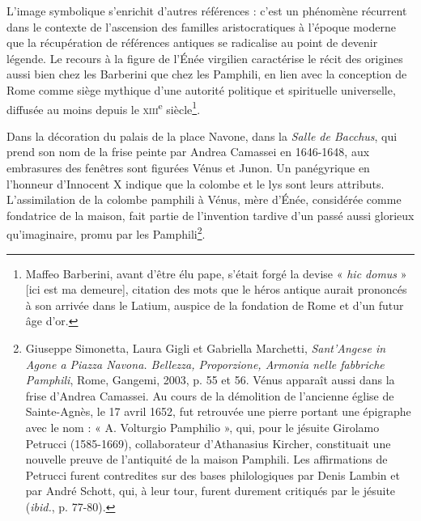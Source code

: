 \documentclass[12pt,twoside,openany]{book}
\begin{document}
L’image symbolique s’enrichit d’autres références : c’est un phénomène récurrent dans le contexte de l’ascension des familles aristocratiques à l’époque moderne que la récupération de références antiques se radicalise au point de devenir légende. Le recours à la figure de l’Énée virgilien caractérise le récit des origines aussi bien chez les Barberini que chez les Pamphili, en lien avec la conception de Rome comme siège mythique d’une autorité politique et spirituelle universelle, diffusée au moins depuis le \textsc{xiii}\textsuperscript{e} siècle\footnote{Maffeo Barberini, avant d’être élu pape, s’était forgé la devise « \textit{hic domus} » [ici est ma demeure], citation des mots que le héros antique aurait prononcés à son arrivée dans le Latium, auspice de la fondation de Rome et d’un futur âge d’or.}.

Dans la décoration du palais de la place Navone, dans la \textit{Salle de Bacchus}, qui prend son nom de la frise peinte par Andrea Camassei en 1646-1648, aux embrasures des fenêtres sont figurées Vénus et Junon. Un panégyrique en l’honneur d’Innocent X indique que la colombe et le lys sont leurs attributs. L’assimilation de la colombe pamphili à Vénus, mère d’Énée, considérée comme fondatrice de la maison, fait partie de l’invention tardive d’un passé aussi glorieux qu’imaginaire, promu par les Pamphili\footnote{Giuseppe Simonetta, Laura Gigli et Gabriella Marchetti, \textit{Sant’Angese in Agone a Piazza Navona. Bellezza, Proporzione, Armonia nelle fabbriche Pamphili}, Rome, Gangemi, 2003, p. 55 et 56. Vénus apparaît aussi dans la frise d’Andrea Camassei. Au cours de la démolition de l’ancienne église de Sainte-Agnès, le 17 avril 1652, fut retrouvée une pierre portant une épigraphe avec le nom : « A. Volturgio Pamphilio », qui, pour le jésuite Girolamo Petrucci (1585-1669), collaborateur d’Athanasius Kircher, constituait une nouvelle preuve de l’antiquité de la maison Pamphili. Les affirmations de Petrucci furent contredites sur des bases philologiques par Denis Lambin et par André Schott, qui, à leur tour, furent durement critiqués par le jésuite (\textit{ibid.}, p. 77-80).}.
\end{document}
